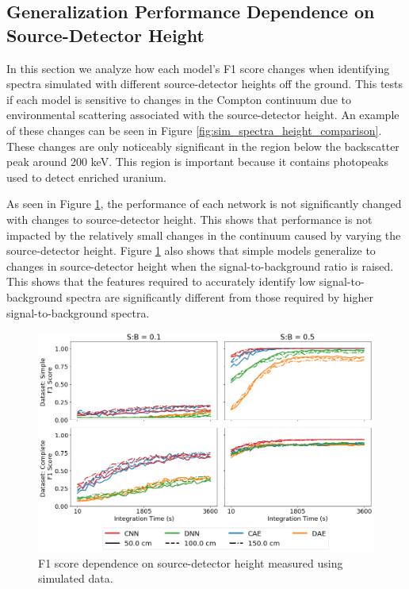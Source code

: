 \subsection{Generalization Performance Dependence on Source-Detector Height}

In this section we analyze how each model's F1 score changes when identifying spectra simulated with different source-detector heights off the ground. This tests if each model is sensitive to changes in the Compton continuum due to environmental scattering associated with the source-detector height. An example of these changes can be seen in Figure \ref{fig:sim_spectra_height_comparison}. These changes are only noticeably significant in the region below the backscatter peak around 200 keV. This region is important because it contains photopeaks used to detect enriched uranium.

As seen in Figure \ref{fig:sim-generalization-height}, the performance of each network is not significantly changed with changes to source-detector height. This shows that performance is not impacted by the relatively small changes in the continuum caused by varying the source-detector height. Figure \ref{fig:sim-generalization-height} also shows that simple models generalize to changes in source-detector height when the signal-to-background ratio is raised. This shows that the features required to accurately identify low signal-to-background spectra are significantly different from those required by higher signal-to-background spectra. 


\begin{figure}[H]
	\centering
	\includegraphics[width=1.0\linewidth]{images/sim-generalization-height}
	\caption{F1 score dependence on source-detector height measured using simulated data.}
	\label{fig:sim-generalization-height}
\end{figure}


